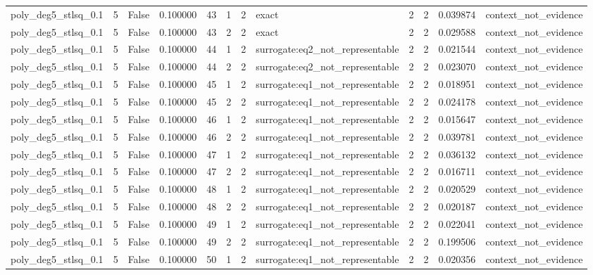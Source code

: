 \begin{tabular}{lrrrrrrlrrrl}
poly\_deg5\_stlsq\_0.1 & 5 & False & 0.100000 & 43 & 1 & 2 & exact & 2 & 2 & 0.039874 & context\_not\_evidence \\
poly\_deg5\_stlsq\_0.1 & 5 & False & 0.100000 & 43 & 2 & 2 & exact & 2 & 2 & 0.029588 & context\_not\_evidence \\
poly\_deg5\_stlsq\_0.1 & 5 & False & 0.100000 & 44 & 1 & 2 & surrogate:eq2\_not\_representable & 2 & 2 & 0.021544 & context\_not\_evidence \\
poly\_deg5\_stlsq\_0.1 & 5 & False & 0.100000 & 44 & 2 & 2 & surrogate:eq2\_not\_representable & 2 & 2 & 0.023070 & context\_not\_evidence \\
poly\_deg5\_stlsq\_0.1 & 5 & False & 0.100000 & 45 & 1 & 2 & surrogate:eq1\_not\_representable & 2 & 2 & 0.018951 & context\_not\_evidence \\
poly\_deg5\_stlsq\_0.1 & 5 & False & 0.100000 & 45 & 2 & 2 & surrogate:eq1\_not\_representable & 2 & 2 & 0.024178 & context\_not\_evidence \\
poly\_deg5\_stlsq\_0.1 & 5 & False & 0.100000 & 46 & 1 & 2 & surrogate:eq1\_not\_representable & 2 & 2 & 0.015647 & context\_not\_evidence \\
poly\_deg5\_stlsq\_0.1 & 5 & False & 0.100000 & 46 & 2 & 2 & surrogate:eq1\_not\_representable & 2 & 2 & 0.039781 & context\_not\_evidence \\
poly\_deg5\_stlsq\_0.1 & 5 & False & 0.100000 & 47 & 1 & 2 & surrogate:eq1\_not\_representable & 2 & 2 & 0.036132 & context\_not\_evidence \\
poly\_deg5\_stlsq\_0.1 & 5 & False & 0.100000 & 47 & 2 & 2 & surrogate:eq1\_not\_representable & 2 & 2 & 0.016711 & context\_not\_evidence \\
poly\_deg5\_stlsq\_0.1 & 5 & False & 0.100000 & 48 & 1 & 2 & surrogate:eq1\_not\_representable & 2 & 2 & 0.020529 & context\_not\_evidence \\
poly\_deg5\_stlsq\_0.1 & 5 & False & 0.100000 & 48 & 2 & 2 & surrogate:eq1\_not\_representable & 2 & 2 & 0.020187 & context\_not\_evidence \\
poly\_deg5\_stlsq\_0.1 & 5 & False & 0.100000 & 49 & 1 & 2 & surrogate:eq1\_not\_representable & 2 & 2 & 0.022041 & context\_not\_evidence \\
poly\_deg5\_stlsq\_0.1 & 5 & False & 0.100000 & 49 & 2 & 2 & surrogate:eq1\_not\_representable & 2 & 2 & 0.199506 & context\_not\_evidence \\
poly\_deg5\_stlsq\_0.1 & 5 & False & 0.100000 & 50 & 1 & 2 & surrogate:eq1\_not\_representable & 2 & 2 & 0.020356 & context\_not\_evidence \\

\end{tabular}
